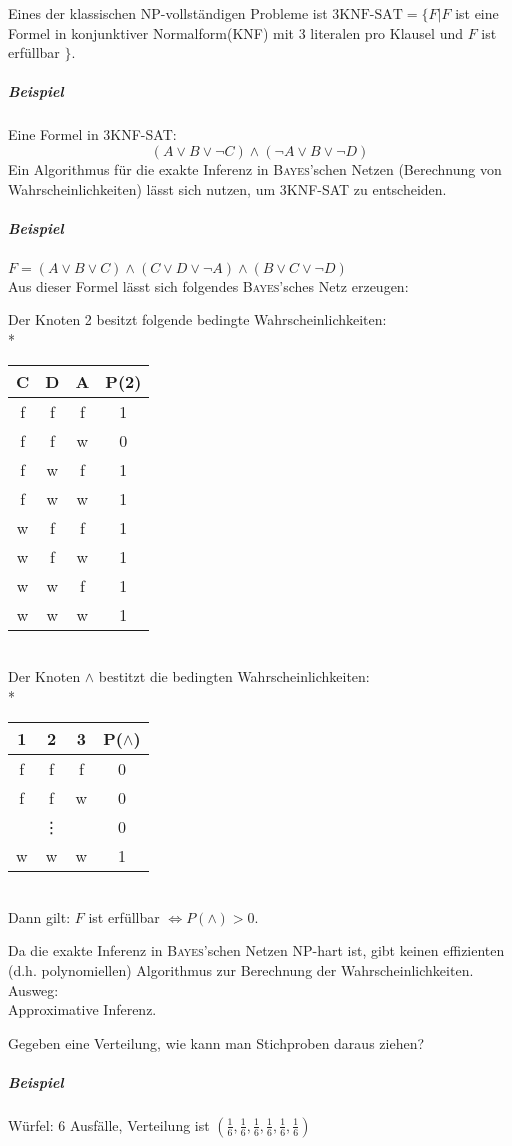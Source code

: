 \documentclass[a4paper]{scrartcl}
\begin{document}
Eines der klassischen NP-vollständigen Probleme ist $ \text{3KNF-SAT} = \{ F | F$ ist eine Formel in konjunktiver Normalform(KNF) mit 3 literalen pro Klausel und $F$ ist erfüllbar $\}$.
\subparagraph{Beispiel} Eine Formel in 3KNF-SAT: \[ (A \vee B \vee \neg C) \wedge ( \neg A \vee B \vee \neg D) \]
Ein Algorithmus für die exakte Inferenz in \textsc{Bayes}'schen Netzen (Berechnung von Wahrscheinlichkeiten) lässt sich nutzen, um 3KNF-SAT zu entscheiden.
\subparagraph{Beispiel} $F= (A \vee B \vee C) \wedge (C \vee D \vee \neg A) \wedge (B \vee C \vee \neg D)$\\
Aus dieser Formel lässt sich folgendes \textsc{Bayes}'sches Netz erzeugen:

Der Knoten 2 besitzt folgende bedingte Wahrscheinlichkeiten:\\*
\begin{tabular}{ccc|c}
C & D & A & P(2) \\ \hline
f & f & f & 1\\
f & f & w & 0\\
f & w & f & 1\\
f & w & w & 1\\
w & f & f & 1\\
w & f & w & 1\\
w & w & f & 1\\
w & w & w & 1\\
\end{tabular}\\
Der Knoten $\wedge$ bestitzt die bedingten Wahrscheinlichkeiten:\\*
\begin{tabular}{ccc|c}
1 & 2 & 3 & P($\wedge$)\\ \hline
f & f & f & 0\\
f & f & w & 0\\
& \vdots & & 0 \\
w & w & w & 1\\
\end{tabular}\\
Dann gilt: $F$ ist erfüllbar $\Leftrightarrow P(\wedge) > 0$.

Da die exakte Inferenz in \textsc{Bayes}'schen Netzen NP-hart ist, gibt keinen effizienten (d.h. polynomiellen) Algorithmus zur Berechnung der Wahrscheinlichkeiten. Ausweg:\\
Approximative Inferenz.

Gegeben eine Verteilung, wie kann man Stichproben daraus ziehen?
\subparagraph{Beispiel} Würfel: 6 Ausfälle, Verteilung ist $(\frac{1}{6},\frac{1}{6},\frac{1}{6},\frac{1}{6},\frac{1}{6},\frac{1}{6})$
\end{document}
